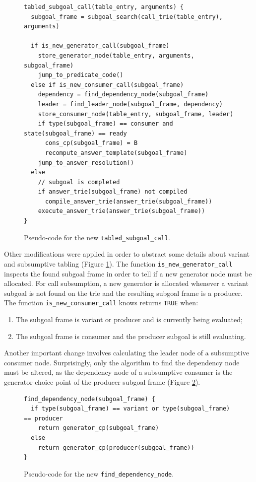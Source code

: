 \begin{figure}[ht]
\begin{Verbatim}
tabled_subgoal_call(table_entry, arguments) {
  subgoal_frame = subgoal_search(call_trie(table_entry), arguments)
  
  if is_new_generator_call(subgoal_frame)
    store_generator_node(table_entry, arguments, subgoal_frame)
    jump_to_predicate_code()
  else if is_new_consumer_call(subgoal_frame)
    dependency = find_dependency_node(subgoal_frame)
    leader = find_leader_node(subgoal_frame, dependency)
    store_consumer_node(table_entry, subgoal_frame, leader)
    if type(subgoal_frame) == consumer and state(subgoal_frame) == ready
      cons_cp(subgoal_frame) = B
      recompute_answer_template(subgoal_frame)
    jump_to_answer_resolution()
  else
    // subgoal is completed
    if answer_trie(subgoal_frame) not compiled
      compile_answer_trie(answer_trie(subgoal_frame))
    execute_answer_trie(answer_trie(subgoal_frame))
}
\end{Verbatim}
\caption{Pseudo-code for the new \texttt{tabled\_subgoal\_call}.}
\label{fig:tabled_subgoal_call_new}
\end{figure}

Other modifications were applied in order to abstract some details about
variant and subsumptive tabling (Figure \ref{fig:tabled_subgoal_call_new}).
The function \texttt{is\_new\_generator\_call} inspects the found
subgoal frame in order to tell if a new generator node must be allocated.
For call subsumption, a new generator is allocated whenever a variant subgoal is not found
on the trie and the resulting subgoal frame is a producer.
The function \texttt{is\_new\_consumer\_call} knows returns \texttt{TRUE} when:

\begin{enumerate}
  \item The subgoal frame is variant or producer and is currently being evaluated;
  \item The subgoal frame is consumer and the producer subgoal is still evaluating.
\end{enumerate}

Another important change involves calculating the leader node of a subsumptive consumer node.
Surprisingly, only the algorithm to find the dependency node must be altered, as
the dependency node of a subsumptive consumer is the generator choice point of
the producer subgoal frame (Figure \ref{fig:find_dependency_node}).  

\begin{figure}[ht]
\begin{Verbatim}
find_dependency_node(subgoal_frame) {
  if type(subgoal_frame) == variant or type(subgoal_frame) == producer
    return generator_cp(subgoal_frame)
  else
    return generator_cp(producer(subgoal_frame))
}
\end{Verbatim}
\caption{Pseudo-code for the new \texttt{find\_dependency\_node}.}
\label{fig:find_dependency_node}
\end{figure}

